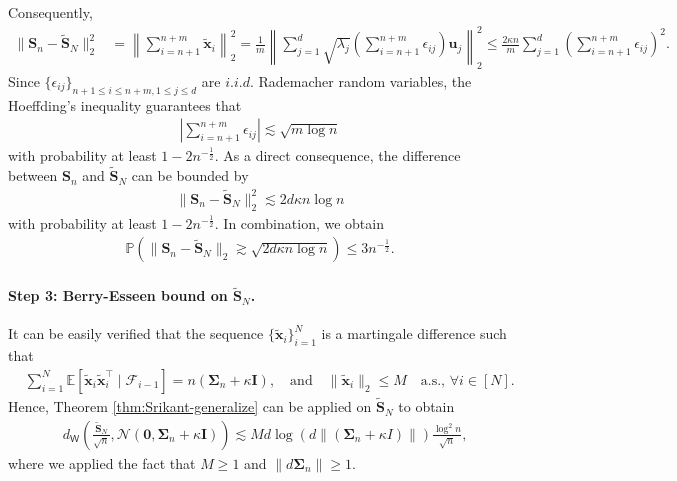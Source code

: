 Consequently, 
\begin{align*}
\|\bm{S}_n - \tilde{\bm{S}}_{N}\|_2^2 &= \left\|\sum_{i=n+1}^{n+m} \tilde{\bm{x}}_i \right\|_2^2 
= \frac{1}{m}\left\|\sum_{j=1}^d \sqrt{\lambda_j} \left(\sum_{i=n+1}^{n+m}\epsilon_{ij}\right)\bm{u}_j\right\|_2^2 
\leq \frac{2\kappa n}{m}  \sum_{j=1}^d \left(\sum_{i=n+1}^{n+m}\epsilon_{ij}\right)^2.
\end{align*}
Since $\{\epsilon_{ij}\}_{n+1 \leq i \leq n+m, 1 \leq j \leq d}$ are $i.i.d.$ Rademacher random variables, the Hoeffding's inequality guarantees that
\begin{align*}
\left|\sum_{i=n+1}^{n+m}\epsilon_{ij}\right| \lesssim \sqrt{m \log n}
\end{align*}
with probability at least $1-2n^{-\frac{1}{2}}$. As a direct consequence, the difference between $\bm{S}_n$ and $\tilde{\bm{S}}_N$ can be bounded by
\begin{align*}
\|\bm{S}_n - \tilde{\bm{S}}_{N}\|_2^2 \lesssim 2 d \kappa n\log n
\end{align*}
with probability at least $1-2n^{-\frac{1}{2}}$. In combination, we obtain
\begin{align*}
\mathbb{P}(\|\bm{S}_n - \tilde{\bm{S}}_N\|_2 \gtrsim \sqrt{2d\kappa n\log n}) \leq 3n^{-\frac{1}{2}}.
\end{align*}

\paragraph{Step 3: Berry-Esseen bound on $\tilde{\bm{S}}_N$.} It can be easily verified that the sequence $\{ \tilde{\bm{x}}_i\}_{i=1}^N$ is a martingale difference such that
\begin{align*}
&\sum_{i=1}^N \mathbb{E}[\tilde{\bm{x}}_i \tilde{\bm{x}}_i^\top \mid \mathscr{F}_{i-1}] = n(\bm{\Sigma}_n + \kappa \bm{I}), \quad \text{and} \quad \|\bm{\tilde{x}}_i\|_2 \leq M \quad \text{a.s., } \forall i \in [N].
\end{align*}
Hence, Theorem \ref{thm:Srikant-generalize} can be applied on $\tilde{\bm{S}}_N$ to obtain 
\begin{align*}
&d_{\mathsf{W}}\left(\frac{\tilde{\bm{S}}_N}{\sqrt{n}}, \mathcal{N}(\bm{0},\bm{\Sigma}_n + \kappa \bm{I})\right) \lesssim Md \log (d\|(\bm{\Sigma}_n + \kappa I)\|)\frac{\log^2 n}{\sqrt{n}},
\end{align*} 
where we applied the fact that $M\geq 1$ and $\|d\bm{\Sigma}_n\| \geq 1.$
